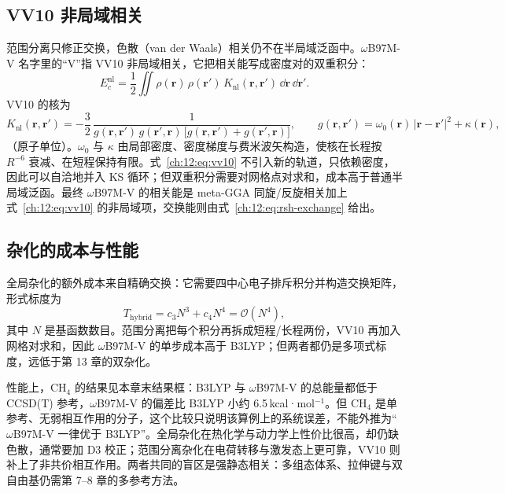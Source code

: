 \subsection{VV10 非局域相关}
\label{ch:12:sec:vv10}

范围分离只修正交换，色散（van der Waals）相关仍不在半局域泛函中。$\omega$B97M-V 名字里的“V”指 VV10 非局域相关\citep{mardirossian2016wb97mv}，它把相关能写成密度对的双重积分：
\begin{equation}
E_c^{\mathrm{nl}}
= \frac{1}{2}\iint
\rho(\mathbf r)\,\rho(\mathbf r')\,
K_{\mathrm{nl}}(\mathbf r,\mathbf r')\,
\dd\mathbf r\,\dd\mathbf r'.
\label{ch:12:eq:vv10}
\end{equation}
VV10 的核为
\begin{equation}
K_{\mathrm{nl}}(\mathbf r,\mathbf r')
= -\frac{3}{2}\,
\frac{1}{g(\mathbf r,\mathbf r')\,g(\mathbf r',\mathbf r)\,
\big[g(\mathbf r,\mathbf r')+g(\mathbf r',\mathbf r)\big]},
\qquad
g(\mathbf r,\mathbf r')
= \omega_0(\mathbf r)\,\lvert\mathbf r-\mathbf r'\rvert^2+\kappa(\mathbf r),
\label{ch:12:eq:vv10-kernel}
\end{equation}
（原子单位）。$\omega_0$ 与 $\kappa$ 由局部密度、密度梯度与费米波矢构造，使核在长程按 $R^{-6}$ 衰减、在短程保持有限。式~\eqref{ch:12:eq:vv10} 不引入新的轨道，只依赖密度，因此可以自洽地并入 KS 循环；但双重积分需要对网格点对求和，成本高于普通半局域泛函。最终 $\omega$B97M-V 的相关能是 meta-GGA 同旋/反旋相关加上式~\eqref{ch:12:eq:vv10} 的非局域项，交换能则由式~\eqref{ch:12:eq:rsh-exchange} 给出。

\subsection{杂化的成本与性能}
\label{ch:12:sec:cost}

全局杂化的额外成本来自精确交换：它需要四中心电子排斥积分并构造交换矩阵，形式标度为
\begin{equation}
T_{\mathrm{hybrid}}
= c_3 N^3 + c_4 N^4
= \mathcal{O}(N^4),
\label{ch:12:eq:hybrid-cost}
\end{equation}
其中 $N$ 是基函数数目。范围分离把每个积分再拆成短程/长程两份，VV10 再加入网格对求和，因此 $\omega$B97M-V 的单步成本高于 B3LYP；但两者都仍是多项式标度，远低于第 13 章的双杂化。

性能上，CH$_4$ 的结果见本章末结果框：B3LYP 与 $\omega$B97M-V 的总能量都低于 CCSD(T) 参考，$\omega$B97M-V 的偏差比 B3LYP 小约 6.5\,kcal·mol$^{-1}$。但 CH$_4$ 是单参考、无弱相互作用的分子，这个比较只说明该算例上的系统误差，不能外推为“$\omega$B97M-V 一律优于 B3LYP”。全局杂化在热化学与动力学上性价比很高，却仍缺色散，通常要加 D3 校正；范围分离杂化在电荷转移与激发态上更可靠，VV10 则补上了非共价相互作用。两者共同的盲区是强静态相关：多组态体系、拉伸键与双自由基仍需第 7--8 章的多参考方法。

